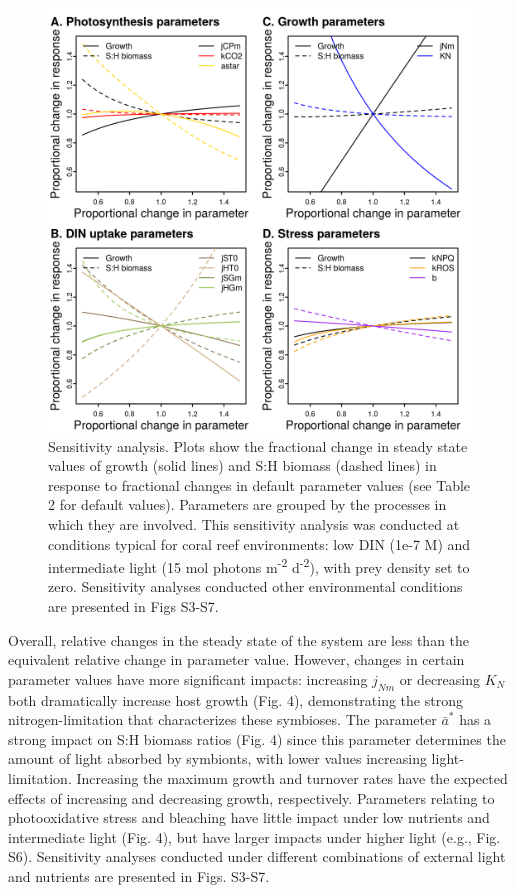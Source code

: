 \documentclass[]{elsarticle} %
\makeatletter
\def\maxwidth{\ifdim\Gin@nat@width>\linewidth\linewidth
\else\Gin@nat@width\fi}
\let\Oldincludegraphics\includegraphics
\renewcommand{\includegraphics}[1]{\Oldincludegraphics[width=\maxwidth]{#1}}
\makeatother
\begin{document}
\begin{figure}[htbp]
\centering
\includegraphics{../img/Fig4.png}
\caption{Sensitivity analysis. Plots show the fractional change in
steady state values of growth (solid lines) and S:H biomass (dashed
lines) in response to fractional changes in default parameter values
(see Table 2 for default values). Parameters are grouped by the
processes in which they are involved. This sensitivity analysis was
conducted at conditions typical for coral reef environments: low DIN
(1e-7 M) and intermediate light (15 mol photons m\textsuperscript{-2}
d\textsuperscript{-2}), with prey density set to zero. Sensitivity
analyses conducted other environmental conditions are presented in Figs
S3-S7.}
\end{figure}

Overall, relative changes in the steady state of the system are less
than the equivalent relative change in parameter value. However, changes
in certain parameter values have more significant impacts: increasing
\(j_{Nm}\) or decreasing \(K_N\) both dramatically increase host growth
(Fig. 4), demonstrating the strong nitrogen-limitation that
characterizes these symbioses. The parameter \(\bar{a}^*\) has a strong
impact on S:H biomass ratios (Fig. 4) since this parameter determines
the amount of light absorbed by symbionts, with lower values increasing
light-limitation. Increasing the maximum growth and turnover rates have
the expected effects of increasing and decreasing growth, respectively.
Parameters relating to photooxidative stress and bleaching have little
impact under low nutrients and intermediate light (Fig. 4), but have
larger impacts under higher light (e.g., Fig. S6). Sensitivity analyses
conducted under different combinations of external light and nutrients
are presented in Figs. S3-S7.
\end{document}
